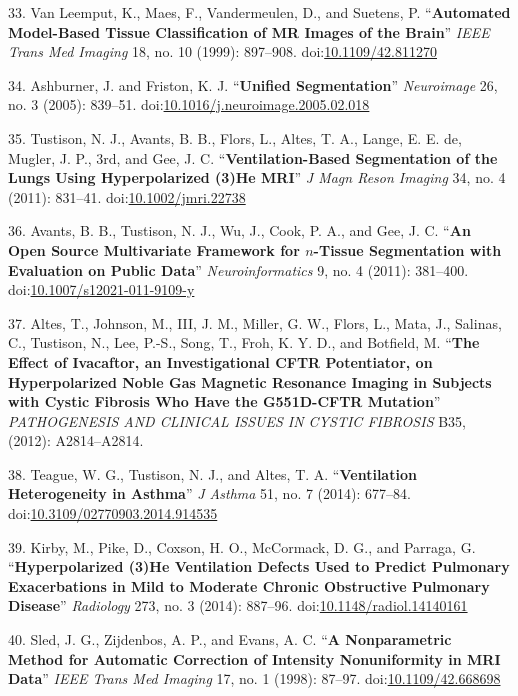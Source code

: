 \documentclass[11pt,]{article}
\begin{document}
33. Van Leemput, K., Maes, F., Vandermeulen, D., and Suetens, P.
``\textbf{Automated Model-Based Tissue Classification of MR Images of
the Brain}'' \emph{IEEE Trans Med Imaging} 18, no. 10 (1999): 897--908.
doi:\href{http://dx.doi.org/10.1109/42.811270}{10.1109/42.811270}

34. Ashburner, J. and Friston, K. J. ``\textbf{Unified Segmentation}''
\emph{Neuroimage} 26, no. 3 (2005): 839--51.
doi:\href{http://dx.doi.org/10.1016/j.neuroimage.2005.02.018}{10.1016/j.neuroimage.2005.02.018}

35. Tustison, N. J., Avants, B. B., Flors, L., Altes, T. A., Lange, E.
E. de, Mugler, J. P., 3rd, and Gee, J. C. ``\textbf{Ventilation-Based
Segmentation of the Lungs Using Hyperpolarized (3)He MRI}'' \emph{J Magn
Reson Imaging} 34, no. 4 (2011): 831--41.
doi:\href{http://dx.doi.org/10.1002/jmri.22738}{10.1002/jmri.22738}

36. Avants, B. B., Tustison, N. J., Wu, J., Cook, P. A., and Gee, J. C.
``\textbf{An Open Source Multivariate Framework for $n$-Tissue
Segmentation with Evaluation on Public Data}'' \emph{Neuroinformatics}
9, no. 4 (2011): 381--400.
doi:\href{http://dx.doi.org/10.1007/s12021-011-9109-y}{10.1007/s12021-011-9109-y}

37. Altes, T., Johnson, M., III, J. M., Miller, G. W., Flors, L., Mata,
J., Salinas, C., Tustison, N., Lee, P.-S., Song, T., Froh, K. Y. D., and
Botfield, M. ``\textbf{The Effect of Ivacaftor, an Investigational CFTR
Potentiator, on Hyperpolarized Noble Gas Magnetic Resonance Imaging in
Subjects with Cystic Fibrosis Who Have the G551D-CFTR Mutation}''
\emph{PATHOGENESIS AND CLINICAL ISSUES IN CYSTIC FIBROSIS} B35, (2012):
A2814--A2814.

38. Teague, W. G., Tustison, N. J., and Altes, T. A.
``\textbf{Ventilation Heterogeneity in Asthma}'' \emph{J Asthma} 51, no.
7 (2014): 677--84.
doi:\href{http://dx.doi.org/10.3109/02770903.2014.914535}{10.3109/02770903.2014.914535}

39. Kirby, M., Pike, D., Coxson, H. O., McCormack, D. G., and Parraga,
G. ``\textbf{Hyperpolarized (3)He Ventilation Defects Used to Predict
Pulmonary Exacerbations in Mild to Moderate Chronic Obstructive
Pulmonary Disease}'' \emph{Radiology} 273, no. 3 (2014): 887--96.
doi:\href{http://dx.doi.org/10.1148/radiol.14140161}{10.1148/radiol.14140161}

40. Sled, J. G., Zijdenbos, A. P., and Evans, A. C. ``\textbf{A
Nonparametric Method for Automatic Correction of Intensity Nonuniformity
in MRI Data}'' \emph{IEEE Trans Med Imaging} 17, no. 1 (1998): 87--97.
doi:\href{http://dx.doi.org/10.1109/42.668698}{10.1109/42.668698}
\end{document}
